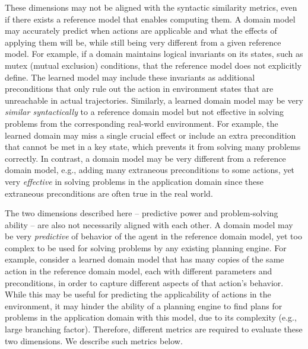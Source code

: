 \documentclass[letterpaper]{article} %
\newif\ifaddcomments
\newcommand{\roni}[1]{\ifaddcomments{\textcolor{red}{[Roni: #1]}}\fi}
\newcommand{\yarin}[1]{\ifaddcomments{\textcolor{teal}{[Yarin: #1]}}\fi}
\newcommand{\gregor}[1]{\ifaddcomments{\textcolor{orange}{[Gregor: #1]}}\fi}
\begin{document}
These dimensions may not be aligned with the syntactic similarity metrics, even if there exists a reference model that enables computing them.  
A domain model may accurately predict when actions are applicable and what the effects of applying them will be, while still being very different from a given reference model. 
For example, if a domain maintains logical invariants on its states, such as mutex (mutual exclusion) conditions, that the reference model does not explicitly define. The learned model may include these invariants as additional preconditions that only rule out the action in environment states that are unreachable in actual trajectories.
Similarly, a learned domain model may be very \emph{similar syntactically} to a reference domain model but not effective in solving problems from the corresponding real-world environment. 
For example, the learned domain may miss a single crucial effect or include an extra precondition that cannot be met in a key state, which prevents it from solving many problems correctly. 
In contrast, a domain model may be very different from a reference domain model, e.g., adding many extraneous preconditions to some actions, yet very \emph{effective} in solving problems in the application domain since these extraneous preconditions are often true in the real world. 


The two dimensions described here -- predictive power and problem-solving ability -- are also not necessarily aligned with each other. A domain model may be very \emph{predictive} of behavior of the agent in the reference domain model, yet too complex to be used for solving problems by any existing planning engine.
For example, consider a learned domain model that has many copies of the same action in the reference domain model, each with different parameters and preconditions, in order to capture different aspects of that action's behavior. 
While this may be useful for predicting the applicability of actions in the environment, 
it may hinder the ability of a planning engine to find plans for problems in the application domain with this model, due to its complexity (e.g., large branching factor). 
Therefore, different metrics are required to evaluate these two dimensions. We describe such metrics below. 
\end{document}
